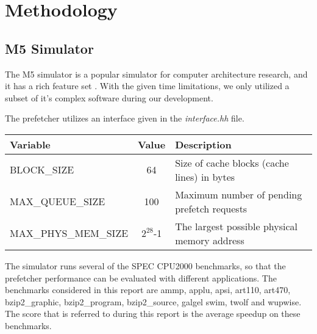 \section{Methodology}

\subsection{M5 Simulator}

The M5 simulator is a popular simulator for computer architecture research, and
it has a rich feature set \cite{user_doc}. With the given time limitations, we only utilized a subset of it’s complex software during our development.


The prefetcher utilizes an interface given in the \emph{interface.hh} file. 
\begin{table}[h]
	\begin{tabularx}{\linewidth}{|X|c|X|}
	\hline 
	Variable & Value & Description \\ 
	\hline 
	BLOCK\_SIZE & 64 & Size of cache blocks (cache lines) in bytes \\ 
	\hline 
	MAX\_QUEUE\_SIZE & 100 & Maximum number of pending prefetch requests \\ 
	\hline 
	MAX\_PHYS\_MEM\_SIZE & $2^{28}$-1 & The largest possible physical memory address \\ 
	\hline 
	\end{tabularx} 
\end{table}








The simulator runs several of the SPEC CPU2000 benchmarks, so that the prefetcher
performance can be evaluated with different applications.
The benchmarks considered in this report are ammp, applu, apsi, art110, art470,
bzip2\_graphic, bzip2\_program, bzip2\_source, galgel swim, twolf and wupwise.
The score that is referred to during this report is the average speedup on these benchmarks.


